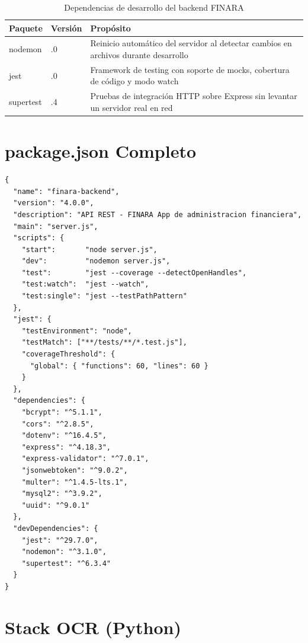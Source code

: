\begin{longtable}{>{\ttfamily}p{3.8cm} >{\centering}p{2cm} p{7.5cm}}
  \caption{Dependencias de desarrollo del backend FINARA}
  \label{tab:deps-dev} \\
  \toprule
  \textbf{Paquete} & \textbf{Versión} & \textbf{Propósito} \\
  \midrule
  nodemon   & 3.1.0  & Reinicio automático del servidor al detectar cambios en archivos durante desarrollo \\
  \addlinespace
  jest      & 29.7.0 & Framework de testing con soporte de mocks, cobertura de código y modo watch \cite{jest_docs} \\
  \addlinespace
  supertest & 6.3.4  & Pruebas de integración HTTP sobre Express sin levantar un servidor real en red \cite{supertest_npm} \\
  \bottomrule
\end{longtable}

\section{package.json Completo}

\begin{lstlisting}[style=json, caption={package.json del backend FINARA v4.0.0}, label={lst:package-json}]
{
  "name": "finara-backend",
  "version": "4.0.0",
  "description": "API REST - FINARA App de administracion financiera",
  "main": "server.js",
  "scripts": {
    "start":       "node server.js",
    "dev":         "nodemon server.js",
    "test":        "jest --coverage --detectOpenHandles",
    "test:watch":  "jest --watch",
    "test:single": "jest --testPathPattern"
  },
  "jest": {
    "testEnvironment": "node",
    "testMatch": ["**/tests/**/*.test.js"],
    "coverageThreshold": {
      "global": { "functions": 60, "lines": 60 }
    }
  },
  "dependencies": {
    "bcrypt": "^5.1.1",
    "cors": "^2.8.5",
    "dotenv": "^16.4.5",
    "express": "^4.18.3",
    "express-validator": "^7.0.1",
    "jsonwebtoken": "^9.0.2",
    "multer": "^1.4.5-lts.1",
    "mysql2": "^3.9.2",
    "uuid": "^9.0.1"
  },
  "devDependencies": {
    "jest": "^29.7.0",
    "nodemon": "^3.1.0",
    "supertest": "^6.3.4"
  }
}
\end{lstlisting}

\section{Stack OCR (Python)}

